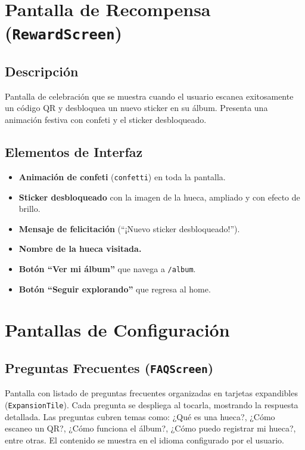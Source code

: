 \documentclass[11pt, a4paper, oneside]{report}
\begin{document}
\section{Pantalla de Recompensa (\texttt{RewardScreen})}

\subsection{Descripción}
Pantalla de celebración que se muestra cuando el usuario escanea exitosamente un código QR y desbloquea un nuevo sticker en su álbum. Presenta una animación festiva con confeti y el sticker desbloqueado.

\subsection{Elementos de Interfaz}
\begin{itemize}
  \item \textbf{Animación de confeti} (\texttt{confetti}) en toda la pantalla.
  \item \textbf{Sticker desbloqueado} con la imagen de la hueca, ampliado y con efecto de brillo.
  \item \textbf{Mensaje de felicitación} (``¡Nuevo sticker desbloqueado!'').
  \item \textbf{Nombre de la hueca visitada.}
  \item \textbf{Botón ``Ver mi álbum''} que navega a \texttt{/album}.
  \item \textbf{Botón ``Seguir explorando''} que regresa al home.
\end{itemize}

\section{Pantallas de Configuración}

\subsection{Preguntas Frecuentes (\texttt{FAQScreen})}
Pantalla con listado de preguntas frecuentes organizadas en tarjetas expandibles (\texttt{ExpansionTile}). Cada pregunta se despliega al tocarla, mostrando la respuesta detallada. Las preguntas cubren temas como: ¿Qué es una hueca?, ¿Cómo escaneo un QR?, ¿Cómo funciona el álbum?, ¿Cómo puedo registrar mi hueca?, entre otras. El contenido se muestra en el idioma configurado por el usuario.
\end{document}
